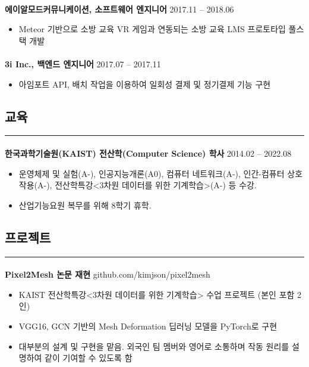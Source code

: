 \documentclass{article}
\begin{document}
\paragraph{}
\textbf{에이알모드커뮤니케이션, 소프트웨어 엔지니어} \hfill 2017.11 -- 2018.06
\begin{itemize}
    \setlength\itemsep{0.1em}
     \item Meteor 기반으로 소방 교육 VR 게임과 연동되는 소방 교육 LMS 프로토타입 풀스택 개발
\end{itemize}
\paragraph{}
\textbf{3i Inc., 백엔드 엔지니어} \hfill 2017.07 -- 2017.11
\begin{itemize}
    \setlength\itemsep{0.1em}
     \item 아임포트 API, 배치 작업을 이용하여 일회성 결제 및 정기결제 기능 구현
\end{itemize}

\begin{center}
    \section*{교육}
\end{center}
\hrule
\paragraph{\newline \newline}
\textbf{한국과학기술원(KAIST) 전산학(Computer Science) 학사} \hfill 2014.02 -- 2022.08
\begin{itemize}
    \setlength\itemsep{0.1em}
    \item 운영체제 및 실험(A-), 인공지능개론(A0), 컴퓨터 네트워크(A-), 인간-컴퓨터 상호작용(A-), 전산학특강<3차원 데이터를 위한 기계학습>(A-) 등 수강.
    \item 산업기능요원 복무를 위해 8학기 휴학.
\end{itemize}

\begin{center}
    \section*{프로젝트}
\end{center}
\hrule
\paragraph{\newline \newline}
\textbf{Pixel2Mesh 논문 재현} \hfill github.com/kimjson/pixel2mesh
\begin{itemize}
    \setlength\itemsep{0.1em}
    \item KAIST 전산학특강<3차원 데이터를 위한 기계학습> 수업 프로젝트 (본인 포함 2인)
    \item VGG16, GCN 기반의 Mesh Deformation 딥러닝 모델을 PyTorch로 구현
    \item 대부분의 설계 및 구현을 맡음. 외국인 팀 멤버와 영어로 소통하며 작동 원리를 설명하여 같이 기여할 수 있도록 함
\end{itemize}
\end{document}
